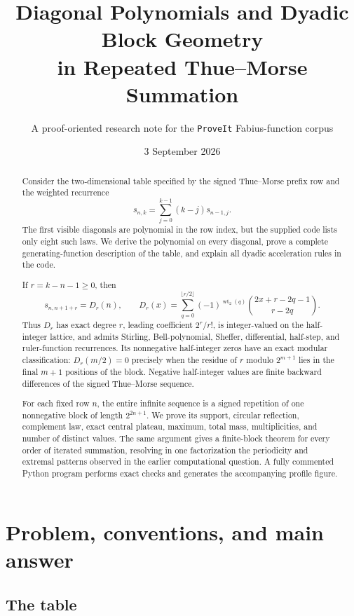 \documentclass[11pt,oneside]{article}
\title{\bfseries Diagonal Polynomials and Dyadic Block Geometry\\
       in Repeated Thue--Morse Summation}
\author{A proof-oriented research note for the \texttt{ProveIt} Fabius-function corpus}
\date{3 September 2026}
\numberwithin{equation}{section}
\theoremstyle{definition}
\theoremstyle{remark}
\newcommand{\wt}{\operatorname{wt}_2}
\newcommand{\Diag}{D}
\begin{document}
\maketitle

\begin{abstract}
Consider the two-dimensional table specified by the signed Thue--Morse prefix
row and the weighted recurrence
\[
 s_{n,k}=\sum_{j=0}^{k-1}(k-j)s_{n-1,j}.
\]
The first visible diagonals are polynomial in the row index, but the supplied
code lists only eight such laws.  We derive the polynomial on every diagonal,
prove a complete generating-function description of the table, and explain
all dyadic acceleration rules in the code.

If \(r=k-n-1\ge0\), then
\[
 s_{n,n+1+r}=\Diag_r(n),\qquad
 \Diag_r(x)=\sum_{q=0}^{\lfloor r/2\rfloor}
 (-1)^{\wt(q)}
 \binom{2x+r-2q-1}{r-2q}.
\]
Thus \(\Diag_r\) has exact degree \(r\), leading coefficient \(2^r/r!\),
is integer-valued on the half-integer lattice, and admits Stirling,
Bell-polynomial, Sheffer, differential, half-step, and ruler-function
recurrences.  Its nonnegative half-integer zeros have an exact modular
classification: \(\Diag_r(m/2)=0\) precisely when the residue of \(r\) modulo
\(2^{m+1}\) lies in the final \(m+1\) positions of the block.  Negative
half-integer values are finite backward differences of the signed
Thue--Morse sequence.

For each fixed row \(n\), the entire infinite sequence is a signed repetition
of one nonnegative block of length \(2^{2n+1}\).  We prove its support,
circular reflection, complement law, exact central plateau, maximum, total
mass, multiplicities, and number of distinct values.  The same argument gives
a finite-block theorem for every order of iterated summation, resolving in one
factorization the periodicity and extremal patterns observed in the earlier
computational question.  A fully commented Python program performs exact
checks and generates the accompanying profile figure.
\end{abstract}

\tableofcontents
\clearpage

\section{Problem, conventions, and main answer}

\subsection{The table}
\end{document}

